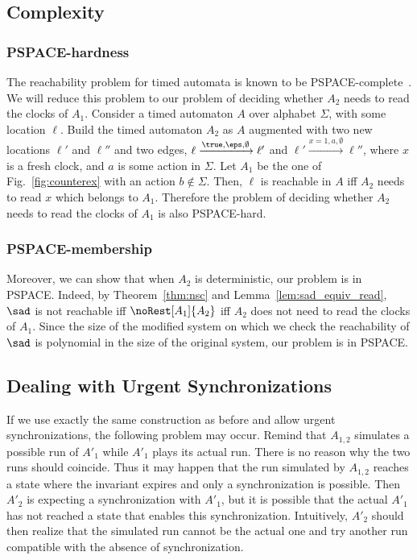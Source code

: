 \documentclass{LMCS}
\theoremstyle{plain}\newtheorem*{prop11}{Proposition~\ref{prop:states} bis}
\begin{document}
\subsection{Complexity}
\subsubsection*{\textsf{PSPACE}-hardness}
The reachability problem for timed automata is known to be
\textsf{PSPACE}-complete~\cite{AD90}. We will reduce this problem to our problem
of deciding whether $A_2$ needs to read the clocks of $A_1$.
Consider a timed automaton $A$ over alphabet $\Sigma$,
with some location $\ell$. Build the timed
automaton $A_2$ as $A$ augmented with two new locations $\ell'$ and $\ell''$
and two edges, $\ell\xrightarrow{\true,\eps,\emptyset}\ell'$ and
$\ell'\xrightarrow{x=1,a,\emptyset}\ell''$, where $x$ is a fresh clock, and
$a$ is some action in $\Sigma$.
Let $A_1$ be the one of Fig.~\ref{fig:counterex} with an action $b\notin\Sigma$.
Then, $\ell$ is reachable in $A$ iff $A_2$ needs to
read $x$ which belongs to $A_1$. Therefore the problem of deciding whether
$A_2$ needs to read the clocks of $A_1$ is also \textsf{PSPACE}-hard.

\subsubsection*{\textsf{PSPACE}-membership}
Moreover, we can show that when $A_2$ is deterministic, our problem is in
\textsf{PSPACE}. Indeed, by Theorem~\ref{thm:nsc} and
Lemma~\ref{lem:sad_equiv_read}, $\sad$ is not reachable iff
$\noRest[A_1]{A_2}$ iff $A_2$ does not need to read the clocks of $A_1$.
Since the size of the modified system on which we check the reachability of
$\sad$ is polynomial in the size of the original system, our problem is in
\textsf{PSPACE}.


\subsection{Dealing with Urgent Synchronizations}
\label{subsec:general}

If we use exactly the same construction as before and allow urgent
synchronizations, the following problem may occur. Remind that $A_{1,2}$
simulates a possible run of $A'_1$ while $A'_1$ plays its actual run. There is
no reason why the two runs should coincide. Thus it may happen that the run
simulated by $A_{1,2}$ reaches a state where the invariant expires and only a
synchronization is possible. Then $A'_2$ is expecting a synchronization with
$A'_1$, but it is possible that the actual $A'_1$ has not reached a state
that enables this synchronization. Intuitively,
$A'_2$ should then realize that the simulated run cannot be the actual one and
try another run compatible with the absence of synchronization.
\end{document}
